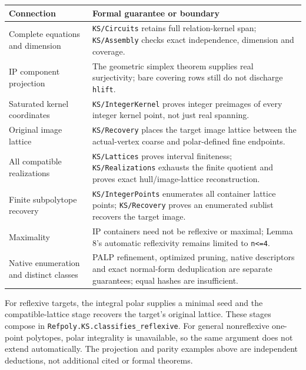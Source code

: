 \documentclass[11pt,a4paper,oneside]{report}
\begin{document}
\begin{longtable}[]{@{}
  >{\raggedright\arraybackslash}p{}
  >{\raggedright\arraybackslash}p{}@{}}
\toprule\noalign{}
\begin{minipage}[b]{\linewidth}\raggedright
Connection
\end{minipage} & \begin{minipage}[b]{\linewidth}\raggedright
Formal guarantee or boundary
\end{minipage} \\
\midrule\noalign{}
\endhead
\bottomrule\noalign{}
\endlastfoot
Complete equations and dimension & \texttt{KS/\allowbreak{}Circuits}
retains full relation-kernel span; \texttt{KS/\allowbreak{}Assembly}
checks exact independence, dimension and coverage. \\
IP component projection & The geometric simplex theorem supplies real
surjectivity; bare covering rows still do not discharge
\texttt{hlift}. \\
Saturated kernel coordinates &
\texttt{KS/\allowbreak{}IntegerK\allowbreak{}ernel} proves integer
preimages of every integer kernel point, not just real spanning. \\
Original image lattice & \texttt{KS/\allowbreak{}Recovery} places the
target image lattice between the actual-vertex coarse and polar-defined
fine endpoints. \\
All compatible realizations & \texttt{KS/\allowbreak{}Lattices} proves
interval finiteness; \texttt{KS/\allowbreak{}Realizat\allowbreak{}ions}
exhausts the finite quotient and proves exact
hull/\allowbreak{}image-\allowbreak{}lattice reconstruction. \\
Finite subpolytope recovery &
\texttt{KS/\allowbreak{}IntegerP\allowbreak{}oints} enumerates all
container lattice points; \texttt{KS/\allowbreak{}Recovery} proves an
enumerated sublist recovers the target image. \\
Maximality & IP containers need not be reflexive or maximal; Lemma 8's
automatic reflexivity remains limited to \texttt{n<=\allowbreak{}4}. \\
Native enumeration and distinct classes & PALP refinement, optimized
pruning, native descriptors and exact normal-form deduplication are
separate guarantees; equal hashes are insufficient. \\
\end{longtable}

For reflexive targets, the integral polar supplies a minimal seed and
the compatible-lattice stage recovers the target's original lattice.
These stages compose in
\texttt{Refpoly.\allowbreak{}KS.\allowbreak{}classifi\allowbreak{}es\_\allowbreak{}reflexiv\allowbreak{}e}.
For general nonreflexive one-point polytopes, polar integrality is
unavailable, so the same argument does not extend automatically. The
projection and parity examples above are independent deductions, not
additional cited or formal theorems.
\end{document}
